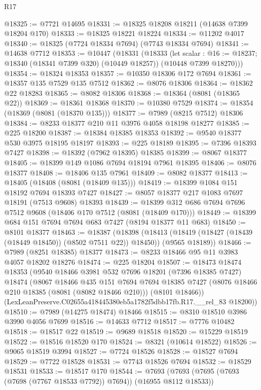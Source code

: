\begin{lexlean}{R17}
\begin{coremodule}
@18325 := @7721 @14695
@18331 := @18325 @18208 @18211 (@14638 @7399 @18204 @170)
@18333 := @18325 @18221 @18224
@18334 := @11202 @4017
@18340 := @18325 (@7724 @18334 @7694) (@7743 @18334 @7694)
@18341 := @14638 @7712
@18353 := @10447
    (@18331
      (@18333
        (let scalar : @16 := @18237; @18340 (@18341 @7399 @320) (@10449 @18257))
        (@10448 @7399 @18270)))
@18354 := @18324 @18353
@18357 := @10350 @18306 @172 @7694
@18361 := @18357 @135 @7529 @135 @7512
@18362 := @8076 @18306
@18364 := @18362 @22 @18283
@18365 := @8082 @18306
@18368 := @18364 (@8081 (@18365 @22))
@18369 := @18361 @18368
@18370 := @10380 @7529
@18374 := @18354 (@18369 (@8081 (@18370 @135)))
@18377 := @7989 (@8215 @7512) @18306
@18384 := @8233 @18377 @210 @11 @3976 @4058 @18198 @18277
@18385 := @225 @18200
@18387 := @18384 @18385 @18353
@18392 := @9540 @18377 @530 @3975 @18195 @18197
@18393 := @225 @18189
@18395 := @7396 @18393 @7427
@18398 := @18392 (@7962 @18395) @18385
@18399 := @8067 @18377
@18405 := @18399 @149 @1086 @7694 @18194 @7961 @18395
@18406 := @8076 @18377
@18408 := @18406 @135 @7961
@18409 := @8082 @18377
@18413 := @18405 (@18408 (@8081 (@18409 @135)))
@18419 := @18399 @1084 @151 @18192 @7694 @18393 @7427
@18427 := @8057 @18377 @217 @1083 @7697 @18191 (@7513 @9608) @18393
@18439 := @18399 @312 @686 @7694 @7696 @7512 @9608 (@18406 @170 @7512 (@8081 (@18409 @170)))
@18449 := @18399 @684 @151 @7694 @7694 @683 @7427 (@8194 @18377 @11 @683)
@18450 := @8101 @18377
@18463 := @18387
    (@18398
      (@18413 (@18419 (@18427 (@18439 (@18449 @18450)) (@8502 @7511 @22)) @18450))
      (@9565 @18189))
@18466 := @7989 (@8251 @18385) @18377
@18473 := @8233 @18466 @95 @11 @3983 @4057 @18202 @18276
@18474 := @225 @18204
@18507 := @18473
    @18474
    @18353
    (@9540
      @18466
      @3981
      @532
      @7696
      @18201
      (@7396 @18385 @7427)
      @18474
      (@8067
        @18466
        @435
        @151
        @7694
        @7694
        @18385
        @7427
        (@8076 @18466 @210 @18385 (@8081 (@8082 @18466 @210)))
        (@8101 @18466))
      (LexLeanPreserve.C02655a418445380eb5a1782f5dbb17fb.R17.__rel_83 @18200))
@18510 := @7989 (@14275 @18474) @18466
@18515 := @8310 @18510 @3986 @3990 @4056 @7699
@18516 := @14633 @7712
@18517 := @7776 @10482
@18518 := @18517 @22
@18519 := @9689 @18518
@18520 := @15229 @18519
@18522 := @18516 @18520 @170
@18524 := @8321 (@10614 @18522)
@18526 := @9065 @18519 @3994
@18527 := @7724 @18526
@18528 := @18527 @7694
@18529 := @7722 @18528
@18531 := @7743 @18526 @7694
@18532 := @18529 @18531
@18533 := @18517 @170
@18544 := @7693 (@7693 (@7695 (@7693 (@7698 (@7767 @18533 @7792)) @7694)) (@16955 @8112 @18533))

\end{coremodule}
\end{lexlean}
